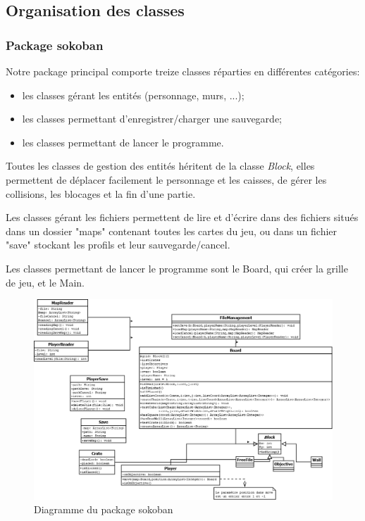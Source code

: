 \documentclass[a4paper,12pt]{article} %
\begin{document}
\subsection{Organisation des classes}

\subsubsection{Package sokoban}

Notre package principal comporte treize classes réparties en différentes catégories:
\begin{itemize}
\item les classes gérant les entités (personnage, murs, ...);
\item les classes permettant d'enregistrer/charger une sauvegarde;
\item les classes permettant de lancer le programme.
\end{itemize}

Toutes les classes de gestion des entités héritent de la classe \textit{Block}, elles permettent de déplacer facilement le personnage et les caisses, de gérer les collisions, les blocages et la fin d'une partie.

Les classes gérant les fichiers permettent de lire et d'écrire dans des fichiers situés dans un dossier "maps" contenant toutes les cartes du jeu, ou dans un fichier "save" stockant les profils et leur sauvegarde/cancel.

Les classes permettant de lancer le programme sont le Board, qui créer la grille de jeu, et le Main.

\begin{figure}[!h]
\centering
\includegraphics[scale=0.3]{images/diag_sokoban.png}
\caption{Diagramme du package sokoban}
\end{figure}
\end{document}
